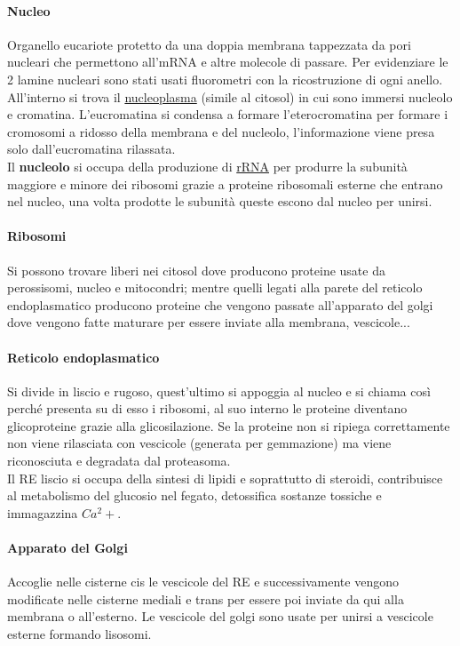 \documentclass[10pt]{article}
\begin{document}
\paragraph*{Nucleo}Organello eucariote protetto da una doppia membrana tappezzata da pori nucleari che permettono all'mRNA e altre molecole di passare. Per evidenziare le 2 lamine nucleari sono stati usati fluorometri con la ricostruzione di ogni anello.\\
All'interno si trova il \underline{nucleoplasma} (simile al citosol) in cui sono immersi nucleolo e  cromatina. L'eucromatina si condensa a formare l'eterocromatina per formare i cromosomi a ridosso della membrana e del nucleolo, l'informazione viene presa solo dall'eucromatina rilassata.\\
Il \textbf{nucleolo} si occupa della produzione di \underline{rRNA} per produrre la subunità maggiore e minore dei ribosomi grazie a proteine ribosomali esterne che entrano nel nucleo, una volta prodotte le subunità queste escono dal nucleo per unirsi.
\paragraph*{Ribosomi}Si possono trovare liberi nei citosol dove producono proteine usate da perossisomi, nucleo e mitocondri; mentre quelli legati alla parete del reticolo endoplasmatico producono proteine che vengono passate all'apparato del golgi dove vengono fatte maturare per essere inviate alla membrana, vescicole...
\paragraph*{Reticolo endoplasmatico}Si divide in liscio e rugoso, quest'ultimo si appoggia al nucleo e si chiama così perché presenta su di esso i ribosomi, al suo interno le proteine diventano glicoproteine grazie alla glicosilazione. Se la proteine non si ripiega correttamente non viene rilasciata con vescicole (generata per gemmazione) ma viene riconosciuta e degradata dal proteasoma. \\
Il RE liscio si occupa della sintesi di lipidi e soprattutto di steroidi, contribuisce al metabolismo del glucosio nel fegato, detossifica sostanze tossiche e immagazzina $Ca^2+$.
\paragraph*{Apparato del Golgi}Accoglie nelle cisterne cis le vescicole del RE e successivamente vengono modificate nelle cisterne mediali e trans per essere poi inviate da qui alla membrana o all'esterno. Le vescicole del golgi sono usate per unirsi a vescicole esterne formando lisosomi.
\end{document}
